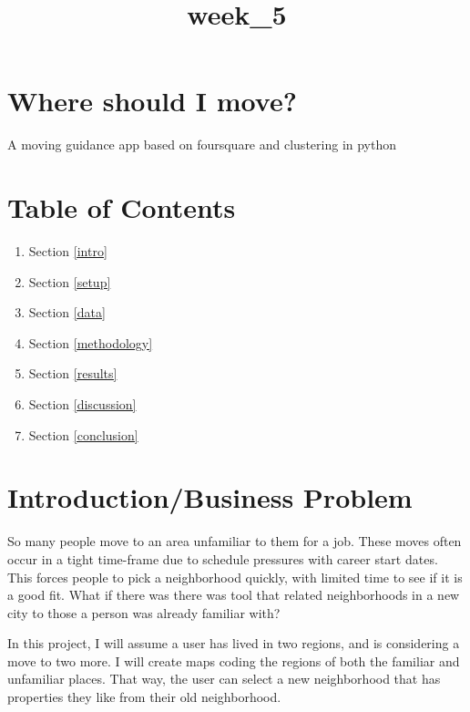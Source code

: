 \documentclass[11pt]{article}
\title{week\_5}
\providecommand{\tightlist}{%
      \setlength{\itemsep}{0pt}\setlength{\parskip}{0pt}}
\begin{document}
    
    
    \maketitle
    
    

    
    \section{\texorpdfstring{\textbf{Where should I
move?}}{Where should I move?}}\label{where-should-i-move}

A moving guidance app based on foursquare and clustering in python

    \section{Table of Contents}\label{table-of-contents}

\begin{enumerate}
\def\labelenumi{\arabic{enumi}.}
\tightlist
\item
  Section \ref{intro}
\item
  Section \ref{setup}
\item
  Section \ref{data}
\item
  Section \ref{methodology}
\item
  Section \ref{results}
\item
  Section \ref{discussion}
\item
  Section \ref{conclusion}
\end{enumerate}

    

    \section{Introduction/Business
Problem}\label{introductionbusiness-problem}

    So many people move to an area unfamiliar to them for a job. These moves
often occur in a tight time-frame due to schedule pressures with career
start dates. This forces people to pick a neighborhood quickly, with
limited time to see if it is a good fit. What if there was there was
tool that related neighborhoods in a new city to those a person was
already familiar with?

In this project, I will assume a user has lived in two regions, and is
considering a move to two more. I will create maps coding the regions of
both the familiar and unfamiliar places. That way, the user can select a
new neighborhood that has properties they like from their old
neighborhood.
\end{document}
